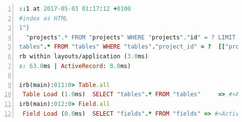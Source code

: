 \documentclass[a4paper,12pt]{article}
\begin{document}
\begin{lstlisting}[frame=single,numbers=left,language = ruby,caption= {Rails console query for table and field existance}, label={code:conex}]
::1 at 2017-05-03 01:17:12 +0100
#index as HTML
1"}
  "projects".* FROM "projects" WHERE "projects"."id" = ? LIMIT 1  [["id", 1]]
tables".* FROM "tables" WHERE "tables"."project_id" = ?  [["project_id", 1]]
rb within layouts/application (3.0ms)
s: 63.0ms | ActiveRecord: 0.0ms)

irb(main):011:0> Table.all  
 Table Load (1.0ms)  SELECT "tables".* FROM "tables"     => #<ActiveRecord::Relation [#<Table id: 2, name: "Store", description: "Store Information", project_id: 1, created_at: "2017-04-24 22:17:38", updated_at: "2017-04-24 22:17:38">, #<Table id: 3, name: "Vehicle", description: "Vehicle Information", project_id: 1, created_at: "2017-04-24 22:17:38", updated_at: "2017-04-24 22:17:38">]> 
irb(main):012:0> Field.all
 Field Load (0.0ms)  SELECT "fields".* FROM "fields" => #<ActiveRecord::Relation []> 
\end{lstlisting}
\end{document}
